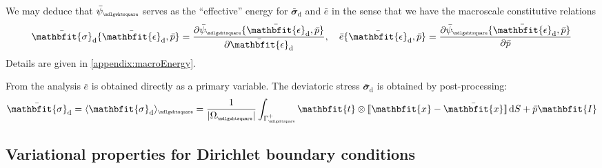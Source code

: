 \documentclass[12pt,a4paper]{article}
\renewcommand{\ta}[1]{\mathbfit{#1}}
\renewcommand{\ts}[1]{\mathbfit{#1}}
\renewcommand{\Box}{\mdlgwhtsquare}
\DeclarePairedDelimiter{\homgen}{\langle}{\rangle_\rve}
\DeclarePairedDelimiter{\jmp}{[\![}{]\!]}
\renewcommand{\dev}{\mathrm{d}}
\newcommand{\volume}{|\Omega_\rve|}
\newcommand{\rve}{
  {\mathchoice
   {\mbox{\scalebox{0.67}{$\Box$}}}
   {\mbox{\scalebox{0.67}{$\Box$}}}
   {\mbox{\scalebox{0.5}{$\Box$}}}
   {\mbox{\scalebox{0.375}{$\Box$}}}
  }
}
\begin{document}
We may deduce that $\bar{\psi}_\rve$ serves as the ``effective'' energy for $\bar{\ts\sigma}_\dev$ and $\bar{e}$ in the sense that we have the macroscale constitutive relations
\begin{equation}
    \bar{\ts\sigma}_\dev\{\bar{\ts\epsilon}_\dev,\bar{p}\} = \frac{\partial \bar{\psi}_\rve\{\bar{\ts\epsilon}_\dev,\bar{p}\}}{\partial \bar{\ts\epsilon}_\dev}, \quad
     \bar{e}\{\bar{\ts\epsilon}_\dev,\bar{p}\} = \frac{\partial \bar{\psi}_\rve\{\bar{\ts\epsilon}_\dev,\bar{p}\}}{\partial \bar{p}}
\label{eq88}
\end{equation}
Details are given in \cref{appendix:macroEnergy}.

From the analysis $\bar{e}$ is obtained directly as a primary variable.
The deviatoric stress $\bar{\ts\sigma}_\dev$ is obtained by post-processing:
\begin{align}
 \bar{\ts\sigma}_\dev = \homgen{\ts\sigma_\dev} = \frac{1}{\volume} \int_{\Gamma_\rve^+} \ta t \outerp \jmp{\ta x - \bar{\ta x}}\dif S + \bar{p}\ts I
\end{align}


\subsection{Variational properties for Dirichlet boundary conditions}
\end{document}
